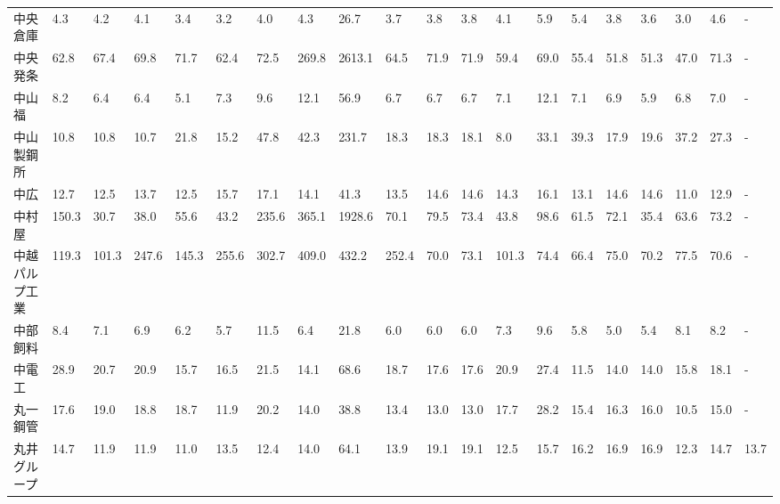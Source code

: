 \begin{longtable}[c]{lp{3mm}p{3mm}p{3mm}p{3mm}p{3mm}p{3mm}p{3mm}p{3mm}p{3mm}p{3mm}p{3mm}p{3mm}p{3mm}p{3mm}p{3mm}p{3mm}p{3mm}p{3mm}p{3mm}}
中央倉庫            &    4.3 &    4.2 &       4.1 &       3.4 &        3.2 &     4.0 &     4.3 &     26.7 &     3.7 &     3.8 &    3.8 &    4.1 &     5.9 &     5.4 &     3.8 &    3.6 &    3.0 &     4.6 &      - \\
中央発条            &   62.8 &   67.4 &      69.8 &      71.7 &       62.4 &    72.5 &   269.8 &   2613.1 &    64.5 &    71.9 &   71.9 &   59.4 &    69.0 &    55.4 &    51.8 &   51.3 &   47.0 &    71.3 &      - \\
中山福             &    8.2 &    6.4 &       6.4 &       5.1 &        7.3 &     9.6 &    12.1 &     56.9 &     6.7 &     6.7 &    6.7 &    7.1 &    12.1 &     7.1 &     6.9 &    5.9 &    6.8 &     7.0 &      - \\
中山製鋼所           &   10.8 &   10.8 &      10.7 &      21.8 &       15.2 &    47.8 &    42.3 &    231.7 &    18.3 &    18.3 &   18.1 &    8.0 &    33.1 &    39.3 &    17.9 &   19.6 &   37.2 &    27.3 &      - \\
中広              &   12.7 &   12.5 &      13.7 &      12.5 &       15.7 &    17.1 &    14.1 &     41.3 &    13.5 &    14.6 &   14.6 &   14.3 &    16.1 &    13.1 &    14.6 &   14.6 &   11.0 &    12.9 &      - \\
中村屋             &  150.3 &   30.7 &      38.0 &      55.6 &       43.2 &   235.6 &   365.1 &   1928.6 &    70.1 &    79.5 &   73.4 &   43.8 &    98.6 &    61.5 &    72.1 &   35.4 &   63.6 &    73.2 &      - \\
中越パルプ工業         &  119.3 &  101.3 &     247.6 &     145.3 &      255.6 &   302.7 &   409.0 &    432.2 &   252.4 &    70.0 &   73.1 &  101.3 &    74.4 &    66.4 &    75.0 &   70.2 &   77.5 &    70.6 &      - \\
中部飼料            &    8.4 &    7.1 &       6.9 &       6.2 &        5.7 &    11.5 &     6.4 &     21.8 &     6.0 &     6.0 &    6.0 &    7.3 &     9.6 &     5.8 &     5.0 &    5.4 &    8.1 &     8.2 &      - \\
中電工             &   28.9 &   20.7 &      20.9 &      15.7 &       16.5 &    21.5 &    14.1 &     68.6 &    18.7 &    17.6 &   17.6 &   20.9 &    27.4 &    11.5 &    14.0 &   14.0 &   15.8 &    18.1 &      - \\
丸一鋼管            &   17.6 &   19.0 &      18.8 &      18.7 &       11.9 &    20.2 &    14.0 &     38.8 &    13.4 &    13.0 &   13.0 &   17.7 &    28.2 &    15.4 &    16.3 &   16.0 &   10.5 &    15.0 &      - \\
丸井グループ          &   14.7 &   11.9 &      11.9 &      11.0 &       13.5 &    12.4 &    14.0 &     64.1 &    13.9 &    19.1 &   19.1 &   12.5 &    15.7 &    16.2 &    16.9 &   16.9 &   12.3 &    14.7 &   13.7 \\

\end{longtable}
